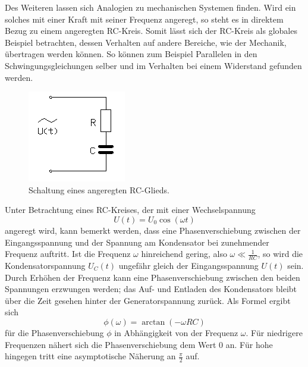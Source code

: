 Des Weiteren lassen sich Analogien zu mechanischen Systemen finden.\newline
Wird ein solches mit einer Kraft mit seiner Frequenz angeregt,
so steht es in direktem Bezug zu einem angeregten RC-Kreis.\newline
Somit lässt sich der RC-Kreis als globales Beispiel betrachten, dessen Verhalten auf andere Bereiche, wie der Mechanik, übertragen werden können.
So können zum Beispiel Parallelen in den Schwingungsgleichungen selber und im Verhalten bei einem Widerstand gefunden werden.
\begin{figure}[H]
  \centering
  \includegraphics[scale=1.0]{bilder/bild22.png}
  \caption{Schaltung eines angeregten RC-Glieds.}
  \label{fig:bild2}
\end{figure}
Unter Betrachtung eines RC-Kreises, der mit einer Wechselspannung
\begin{equation*}
  U(t)=U_0\cos(\omega t)
\label{eq:angeregt}
\end{equation*}
angeregt wird, kann bemerkt werden, dass eine Phasenverschiebung \phi zwischen der Eingangsspannung und der Spannung
am Kondensator bei zunehmender Frequenz auftritt.\newline
Ist die Frequenz $\omega$ hinreichend gering, also $\omega \ll \frac{1}{RC}$,
so wird die Kondensatorspannung $U_C(t)$ ungefähr gleich der Eingangsspannung $U(t)$ sein.\newline
Durch Erhöhen der Frequenz kann eine Phasenverschiebung zwischen den beiden Spannungen erzwungen werden;
das Auf- und Entladen des Kondensators bleibt über die Zeit gesehen hinter der Generatorspannung zurück.\newline
Als Formel ergibt sich
\begin{equation}
  \phi (\omega) = \arctan(-\omega RC)
\label{eq:phase}
\end{equation}
für die Phasenverschiebung $\phi$ in Abhängigkeit von der Frequenz $\omega$.\newline
Für niedrigere Frequenzen nähert sich die Phasenverschiebung dem Wert 0 an.\newline
Für hohe hingegen tritt eine asymptotische Näherung an $\frac{\pi}{2}$ auf.\newline

